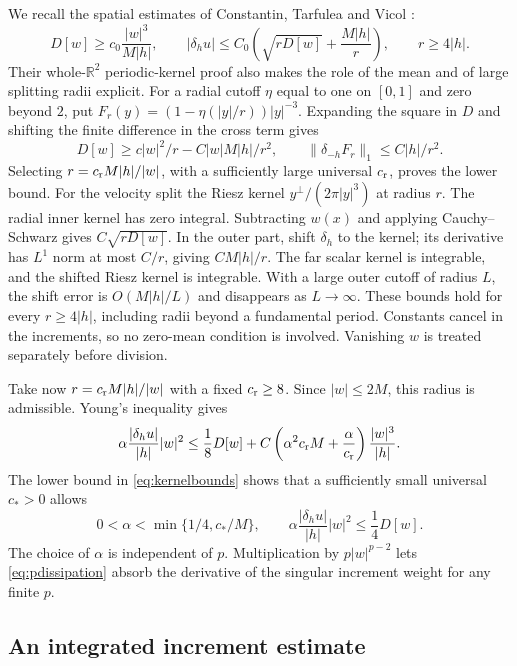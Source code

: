 \documentclass[11pt]{amsart}
\theoremstyle{remark}
\numberwithin{equation}{section}
\newcommand{\R}{\mathbb R}
\newcommand{\norm}[1]{\lVert#1\rVert}
\begin{document}
We recall the spatial estimates of Constantin, Tarfulea and Vicol
\cite[(4.15)--(4.25), August 2, 2013 author version]{CTV}:
\begin{equation}\label{eq:kernelbounds}
 D[w]\geq c_0\frac{|w|^3}{M|h|},\qquad
 |\delta_hu|\leq C_0\left(\sqrt{rD[w]}+\frac{M|h|}{r}\right),
 \qquad r\geq4|h|.
\end{equation}
Their whole-$\R^2$ periodic-kernel proof also makes the role of the mean and
of large splitting radii explicit. For a radial cutoff $\eta$ equal to one
on $[0,1]$ and zero beyond $2$, put
$F_r(y)=(1-\eta(|y|/r))|y|^{-3}$. Expanding the square in $D$ and shifting
the finite difference in the cross term gives
\[
 D[w]\geq c|w|^2/r-C|w|M|h|/r^2,
 \qquad \norm{\delta_{-h}F_r}_1\leq C|h|/r^2.
\]
Selecting $r=c_{\rm r}M|h|/|w|$, with a sufficiently large universal
$c_{\rm r}$, proves the lower bound. For the velocity split the Riesz kernel
$y^\perp/(2\pi|y|^3)$ at radius $r$. The radial inner kernel has zero
integral. Subtracting $w(x)$ and applying Cauchy--Schwarz gives
$C\sqrt{rD[w]}$. In the outer part, shift $\delta_h$ to the kernel; its
derivative has $L^1$ norm at most $C/r$, giving $CM|h|/r$.
The far scalar kernel is integrable, and the shifted Riesz kernel is
integrable. With a large outer cutoff of radius $L$, the shift error is
$O(M|h|/L)$ and disappears as $L\to\infty$. These bounds hold for every
$r\geq4|h|$, including radii beyond a fundamental period. Constants cancel
in the increments, so no zero-mean condition is involved. Vanishing $w$ is
treated separately before division.

Take now $r=c_{\rm r}M|h|/|w|$ with a fixed $c_{\rm r}\geq8$. Since
$|w|\leq2M$, this radius is admissible. Young's inequality gives
\[
 \alpha\frac{|\delta_hu|}{|h|}|w|^2
 \leq\frac18D[w]+C\left(\alpha^2c_{\rm r}M+\frac\alpha{c_{\rm r}}\right)
                       \frac{|w|^3}{|h|}.
\]
The lower bound in \eqref{eq:kernelbounds} shows that a sufficiently small
universal $c_*>0$ allows
\begin{equation}\label{eq:absorption}
 0<\alpha<\min\{1/4,c_*/M\},\qquad
 \alpha\frac{|\delta_hu|}{|h|}|w|^2\leq\frac14D[w].
\end{equation}
The choice of $\alpha$ is independent of $p$. Multiplication by
$p|w|^{p-2}$ lets \eqref{eq:pdissipation} absorb the derivative of the
singular increment weight for any finite $p$.

\subsection{An integrated increment estimate}
\end{document}
